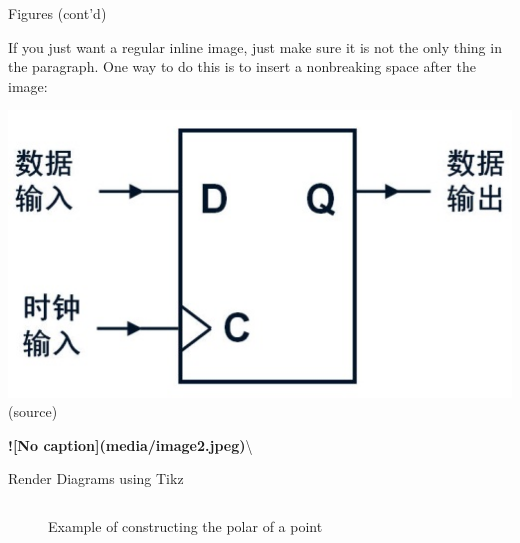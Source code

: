 \documentclass[10pt,ignorenonframetext,serif,onlymath]{beamer}
\newenvironment{Shaded}{}{}
\newcommand{\AlertTok}[1]{\textcolor[rgb]{1.00,0.00,0.00}{\textbf{#1}}}
\newcommand{\CommentTok}[1]{\textcolor[rgb]{0.38,0.63,0.69}{\textit{#1}}}
\newcommand{\ExtensionTok}[1]{#1}
\newcommand{\FunctionTok}[1]{\textcolor[rgb]{0.02,0.16,0.49}{#1}}
\newcommand{\KeywordTok}[1]{\textcolor[rgb]{0.00,0.44,0.13}{\textbf{#1}}}
\newcommand{\NormalTok}[1]{#1}
\begin{document}
\begin{frame}[fragile]{Figures (cont’d)}
\protect\hypertarget{sec:figures-contd}{}

If you just want a regular inline image, just make sure it is not the
only thing in the paragraph. One way to do this is to insert a
nonbreaking space after the image:

\includegraphics{media/image2.jpeg}\\

(source)

\begin{Shaded}
\begin{Highlighting}[]
\AlertTok{![No caption](media/image2.jpeg)}\NormalTok{\textbackslash{}}
\end{Highlighting}
\end{Shaded}

\end{frame}

\begin{frame}[fragile]{Render Diagrams using Tikz}
\protect\hypertarget{sec:render-diagrams-using-tikz}{}

\begin{columns}

\scriptsize

\begin{Shaded}
\end{Shaded}


\begin{figure}[hp]
\centering

\caption{Example of constructing
    the polar of a point}%
\label{fig:pole2polar}
\end{figure}

\end{columns}

\end{frame}
\end{document}
